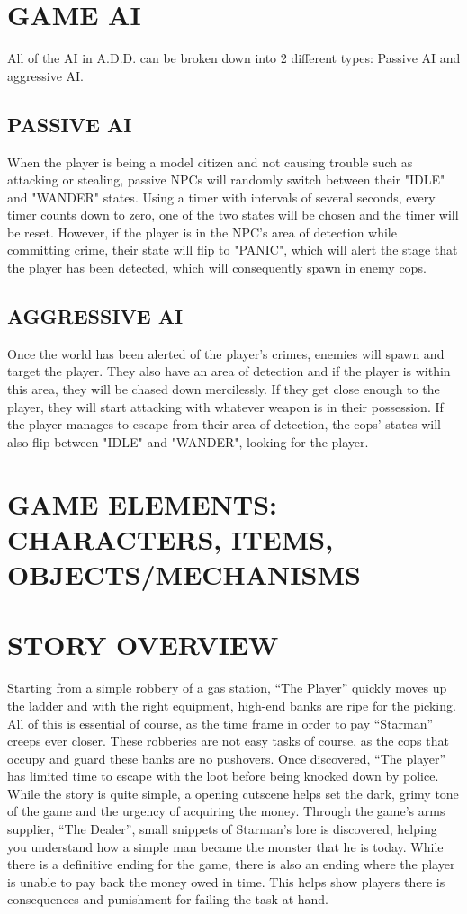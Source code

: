 \documentclass{article}
\begin{document}
\section{GAME AI \label{ai}}
All of the AI in A.D.D. can be broken down into 2 different types: Passive AI and aggressive AI.

\subsection{PASSIVE AI \label{passAI}}
When the player is being a model citizen and not causing trouble such as attacking or stealing, passive NPCs will randomly switch between their "IDLE" and "WANDER" states. Using a timer with intervals of several seconds, every timer counts down to zero, one of the two states will be chosen and the timer will be reset. However, if the player is in the NPC's area of detection while committing crime, their state will flip to "PANIC", which will alert the stage that the player has been detected, which will consequently spawn in enemy cops.

\subsection{AGGRESSIVE AI \label{aggAI}}
Once the world has been alerted of the player's crimes, enemies will spawn and target the player. They also have an area of detection and if the player is within this area, they will be chased down mercilessly. If they get close enough to the player, they will start attacking with whatever weapon is in their possession. If the player manages to escape from their area of detection, the cops' states will also flip between "IDLE" and "WANDER", looking for the player.

\section{GAME ELEMENTS: CHARACTERS, ITEMS, OBJECTS/MECHANISMS \label{elements}}

\section{STORY OVERVIEW \label{storyover}}
Starting from a simple robbery of a gas station, “The Player” quickly moves up the ladder and with the right equipment, high-end banks are ripe for the picking. All of this is essential of course, as the time frame in order to pay “Starman” creeps ever closer.
\bigbreak
These robberies are not easy tasks of course, as the cops that occupy and guard these banks are no pushovers. Once discovered, “The player” has limited time to escape with the loot before being knocked down by police.
\bigbreak
While the story is quite simple, a opening cutscene helps set the dark, grimy tone of the game and the urgency of acquiring the money. Through the game’s arms supplier, “The Dealer”, small snippets of Starman’s lore is discovered, helping you understand how a simple man became the monster that he is today.
\bigbreak
While there is a definitive ending for the game, there is also an ending where the player is unable to pay back the money owed in time. This helps show players there is consequences and punishment for failing the task at hand.
\end{document}
